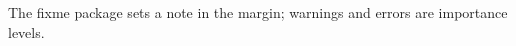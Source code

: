 \documentclass[11pt]{article}\usepackage[paperwidth=14cm,paperheight=7cm,left=1cm,right=3.6cm,top=1cm,bottom=1cm,marginparwidth=2.6cm,marginparsep=3mm]{geometry}\pagestyle{empty}
\begin{document}
The fixme package sets a note in the margin; warnings and errors are importance levels.
\end{document}
